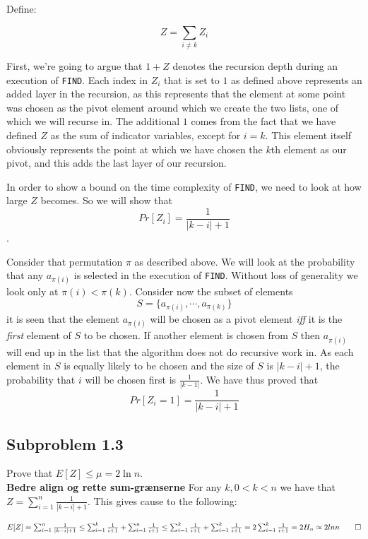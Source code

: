 \documentclass[article,a4paper,oneside]{memoir}
\newcommand{\+}[1]{\ensuremath{\boldsymbol{#1}}}
\begin{document}
Define:

$$Z=\sum_{i\neq k} Z_i$$

First, we're going to argue that $1+Z$ denotes the recursion depth during an execution of \texttt{FIND}. Each index in $Z_i$ that is set to $1$ as defined above represents an added layer in the recursion, as this represents that the element at some point was chosen as the pivot element around which we create the two lists, one of which we will recurse in. The additional $1$ comes from the fact that we have defined $Z$ as the sum of indicator variables, except for $i=k$. This element itself obviously represents the point at which we have chosen the $k$th element as our pivot, and this adds the last layer of our recursion.
\par
In order to show a bound on the time complexity of \texttt{FIND}, we need to look at how large $Z$ becomes. So we will show that $$Pr[Z_{i}]=\frac{1}{|k-i|+1}$$.
\par
Consider that permutation $\pi$ as described above. We will look at the probability that any $a_{\pi(i)}$ is selected in the execution of \texttt{FIND}. Without loss of generality we look only at $\pi(i) < \pi(k)$. Consider now the subset of elements $$S = \lbrace a_{\pi(i)},\cdots,a_{\pi(k)}\rbrace$$ it is seen that the element $a_{\pi(i)}$ will be chosen as a pivot element \emph{iff} it is the \emph{first} element of $S$ to be chosen. If another element is chosen from $S$ then $a_{\pi(i)}$ will end up in the list that the algorithm does not do recursive work in. As each element in $S$ is equally likely to be chosen and the size of $S$ is $|k - i| + 1$, the probability that $i$ will be chosen first is $\frac{1}{|k -1|}$. We have thus proved that $$Pr[Z_{i} = 1] = \frac{1}{|k-i|+1}$$



\subsection{Subproblem 1.3} 
Prove that $E[Z]\leq \mu = 2\ln n$.\\
\textbf{Bedre align og rette sum-grænserne}
For any $k, 0<k<n$ we have that $Z = \sum_{i=1}^{n} \frac{1}{|k-i|+1}$.
This gives cause to the following:

$E[Z] = \sum_{i=1}^{n} \frac{1}{|k-i|+1}
\\ \leq \sum_{i=1}^{k} \frac{1}{i+1} + \sum_{i=1}^{n} \frac{1}{i+1}
\\ \leq \sum_{i=1}^{k} \frac{1}{i+1} + \sum_{i=1}^{k} \frac{1}{i+1}
\\ = 2\sum_{i=1}^{k} \frac{1}{i+1}
\\ = 2H_n
\\ \approx 2lnn \qedhere$
\end{document}
